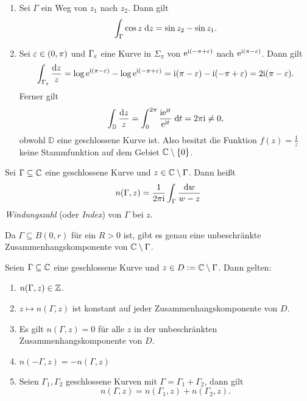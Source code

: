 \documentclass[a4paper,twoside,DIV15,BCOR12mm]{scrbook}
\begin{document}
\begin{bsp}
  \begin{enumerate}
  \item Sei $\Gamma$ ein Weg von $z_1$ nach $z_2$. Dann gilt
    \[\int_{\Gamma}^{}{\cos{z}}\;\mathrm{d} z = \sin{z_2}-\sin{z_1}.\]
  \item Sei $\varepsilon\in(0,\pi)$ und $\Gamma_\varepsilon$ eine Kurve in $\Sigma_\pi$ von $\mathrm{e}^{\mathrm{i}(-\pi+\varepsilon)}$ nach $\mathrm{e}^{\mathrm{i}(\pi-\varepsilon)}$. Dann
    gilt
    \[\int_{\Gamma_\varepsilon}{\frac{\mathrm{d}z}{z}} = \log{\mathrm{e}^{\mathrm{i}(\pi-\varepsilon)}} - \log{\mathrm{e}^{\mathrm{i}(-\pi+\varepsilon)}} = \mathrm{i}(\pi-\varepsilon) - \mathrm{i}(-\pi+\varepsilon)
    = 2\mathrm{i}(\pi-\varepsilon).\]
    Ferner gilt
    \[\int_{\mathbb{D}}{\frac{\mathrm{d}z}{z}} = \int_{0}^{2\pi}{\frac{\mathrm{i}\mathrm{e}^{\mathrm{i} t}}{\mathrm{e}^{\mathrm{i} t}}}\;\mathrm{d} t = 2\pi\mathrm{i} \neq 0,\]
    obwohl $\mathbb{D}$ eine geschlossene Kurve ist. Also besitzt die Funktion $f(z)=\frac1z$ keine Stammfunktion auf dem Gebiet
    $\mathbb{C}\setminus\{0\}$.
  \end{enumerate}
\end{bsp}

\begin{dfn}
  Sei $\Gamma\subseteq\mathbb{C}$ eine geschlossene Kurve und $z\in\mathbb{C}\setminus\Gamma$. Dann heißt
  \[ n(\Gamma,z) = \frac{1}{2\pi\mathrm{i}} \int_\Gamma{\frac{\mathrm{d}w}{w-z}} \]
  \emph{Windungszahl} (oder \emph{Index}) von $\Gamma$ bei $z$.
\end{dfn}


\begin{bem*} Da $\Gamma \subseteq B(0,r)$ für ein $R>0$ ist, gibt es genau eine unbeschränkte Zusammenhangskomponente von $\mathbb{C}\setminus\Gamma$.
\end{bem*}

\begin{satz}\label{satz2.16}
Seien $\Gamma \subseteq \mathbb{C}$ eine geschlossene Kurve und $z\in D:= \mathbb{C}\setminus\Gamma$. Dann gelten:
\begin{enumerate}
\item $n(\Gamma,z)\in\mathbb{Z}$.
\item $z\mapsto n(\Gamma,z)$ ist konstant auf jeder Zusammenhangskomponente von $D$.
\item Es gilt $n(\Gamma,z) = 0$ für alle $z$ in der unbeschränkten Zusammenhangskomponente von $D$.
\item $n(-\Gamma,z) = -n(\Gamma,z)$
\item Seien $\Gamma_1,\Gamma_2$ geschlossene Kurven mit $\Gamma = \Gamma_1 + \Gamma_2$, dann gilt
\[n(\Gamma,z) = n(\Gamma_1,z)+n(\Gamma_2,z).\]
\end{enumerate}
\end{satz}
\end{document}
